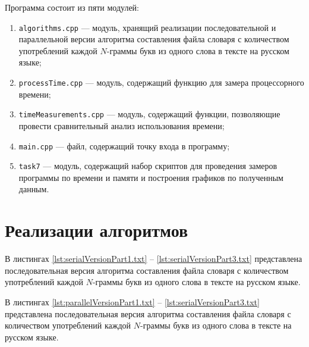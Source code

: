 Программа состоит из пяти модулей: 

\begin{enumerate}[label={\arabic*)}]
	\item \texttt{algorithms.cpp} --- модуль, хранящий реализации последовательной и параллельной версии алгоритма составления файла словаря с количеством употреблений каждой $N$-граммы букв из одного слова в тексте на русском языке;
	\item \texttt{processTime.cpp} --- модуль, содержащий функцию для замера процессорного времени;
	\item \texttt{timeMeasurements.cpp} --- модуль, содержащий функции, позволяющие провести сравнительный анализ использования времени;
	\item \texttt{main.cpp} --- файл, содержащий точку входа в программу;
	\item \texttt{task7} --- модуль, содержащий набор скриптов для проведения замеров программы по времени и памяти и построения графиков по полученным данным.
\end{enumerate}

\clearpage

\section{Реализации алгоритмов}

В листингах \ref{lst:serialVersionPart1.txt} -- \ref{lst:serialVersionPart3.txt} представлена последовательная версия алгоритма составления файла словаря с количеством употреблений каждой $N$-граммы букв из одного слова в тексте на русском языке.

%
%
%
%

\clearpage

В листингах \ref{lst:parallelVersionPart1.txt} -- \ref{lst:serialVersionPart3.txt} представлена последовательная версия алгоритма составления файла словаря с количеством употреблений каждой $N$-граммы букв из одного слова в тексте на русском языке.

